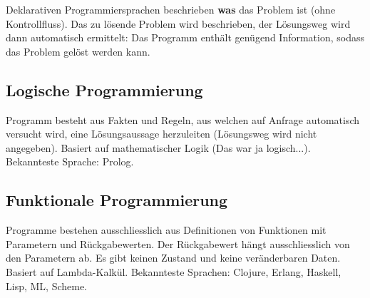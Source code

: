 Deklarativen Programmiersprachen beschrieben \textbf{was} das Problem ist (ohne Kontrollfluss). Das zu lösende Problem wird beschrieben, der Lösungsweg wird dann automatisch ermittelt: Das Programm enthält genügend Information, sodass das Problem gelöst werden kann.

\subsection{Logische Programmierung}

Programm besteht aus Fakten und Regeln, aus welchen auf Anfrage automatisch versucht wird, eine Lösungsaussage herzuleiten (Lösungsweg wird nicht angegeben). Basiert auf mathematischer Logik (Das war ja logisch...). Bekannteste Sprache: Prolog.

\subsection{Funktionale Programmierung}

Programme bestehen ausschliesslich aus Definitionen von Funktionen mit Parametern und Rückgabewerten. Der Rückgabewert hängt ausschliesslich von den Parametern ab. Es gibt keinen Zustand und keine veränderbaren Daten. Basiert auf Lambda-Kalkül. Bekannteste Sprachen: Clojure, Erlang, Haskell, Lisp, ML, Scheme.
